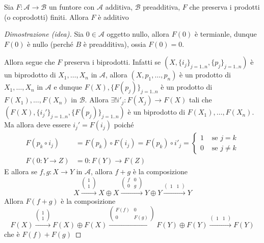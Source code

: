 \begin{proposition}{}\label{prop:F_add}
    Sia \(F : \mathcal{A} \to \mathcal{B}\) un funtore con \(\mathcal{A}\)
    additiva, \(\mathcal{B}\) preadditiva, \(F\) che preserva i prodotti (o
    coprodotti) finiti. Allora \(F\) è additivo
\end{proposition}
\begin{proof}[Dimostrazione (idea)]
    Sia \(0 \in \mathcal{A}\) oggetto nullo, allora \(F{(0)}\) è termianle,
    dunque \(F{(0)}\) è nullo (perché \(B\) è preadditiva), ossia \(F{(0)} = 0\).

    Allora segue che \(F\) preserva i biprodotti. Infatti se \((X, \{i_j\}_{j = 1. .n}, \{p_{j}\}_{j= 1. .n})\)
    è un biprodotto di \(X_{1}, \dots, X_{n}\) in \(\mathcal{A}\), allora \({(X, p_{1}, \dots, p_{n})}\) è un prodotto di \(X_{1}, \dots, X_{n}\) in \(\mathcal{A}\)
    e dunque \(F{(X)}, \{F{(p_{j})}\}_{j = 1. .n} \) è un prodotto di 
    \(F{(X_{1})}, \dots, F{(X_{n})}\) in \(\mathcal{B}\). Allora \(\exists !
    i'_j : F{(X_{j})} \to F{(X)}\) tali che \({(F{(X)}, \{i_{j}'\}_{j = 1. .n}, \{F{(p_{j})}\}_{j = 1. .n})}\)
    è un biprodotto di \(F{(X_{1})}, \dots, F{(X_{n})}\). Ma allora deve essere
    \(i_{j}' = F{(i_{j})}\) poiché 
    \begin{align*}
        F{(p_k \circ i_j)} &= F{(p_k)} \circ F{(i_{j})} = F{(p_k)} \circ i'_j = \begin{cases}{}
          1 & \text{ se } j = k \\
          0 & \text{ se } j\neq k
      \end{cases} \\
            F{(0 : Y \to Z)} &= 0 : F{(Y)} \to F{(Z)}
    \end{align*}
    E allora se \(f, g : X \to Y\) in \(\mathcal{A}\), allora \(f + g\) è la
    composizione
    \[
      X \overset{\begin{pmatrix}
          1 \\
          1
      \end{pmatrix}}{\longrightarrow} X \oplus X \overset{\begin{pmatrix}
          f & 0 \\
          0 & g
      \end{pmatrix}}{\longrightarrow} Y \oplus Y \overset{\begin{pmatrix}
          1 & 1
      \end{pmatrix}}{\longrightarrow} Y
    \]
    Allora \(F {(f + g)}\) è la composizione
    \[
      F{(X)} \overset{\begin{pmatrix}
          1 \\
          1
      \end{pmatrix}}{\longrightarrow} F{(X)} \oplus F{(X)} \overset{\begin{pmatrix}
          F{(f)} & 0 \\
          0 & F{(g)}
      \end{pmatrix}}{\longrightarrow} F{(Y)} \oplus F{(Y)} \overset{\begin{pmatrix}
          1 & 1
      \end{pmatrix}}{\longrightarrow} F{(Y)}
    \]
    che è \(F{(f)} + F{(g)}\) 
\end{proof}

